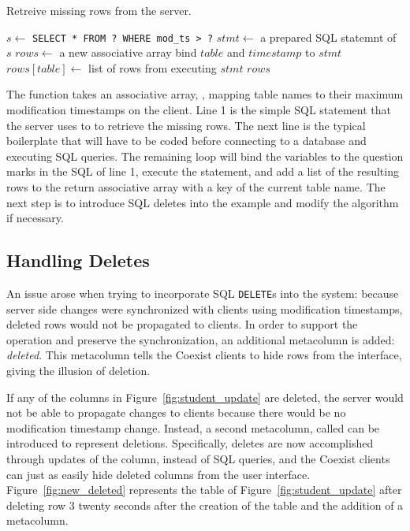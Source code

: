 \begin{algorithm}[h]
\caption{Retreive missing rows from the server.}
\label{alg:sync}
\begin{algorithmic}[1]


  \STATE $s \gets $ \texttt{\sq SELECT * FROM ? WHERE mod\_ts > ?\sq}
  \STATE $stmt \gets $ a prepared SQL statemnt of $s$
  \STATE $rows \gets$ a new associative array
    \STATE bind $table$ and $timestamp$ to $stmt$
    \STATE $rows[table] \gets$ list of rows from executing $stmt$
  \ENDFOR
  \RETURN $rows$
  
\end{algorithmic}
\end{algorithm}

The  function takes an associative array, , mapping table
names to their maximum modification timestamps on the client. Line 1 is the
simple SQL statement that the server uses to to retrieve the missing rows.
The next line is the typical boilerplate that will have to be coded before
connecting to a database and executing SQL queries. The remaining loop will bind
the variables to the question marks in the SQL of line 1, execute the statement,
and add a list of the resulting rows to the return associative array with a key
of the current table name.  The next step is to introduce SQL deletes into the
example and modify the algorithm if necessary.

\subsection{Handling Deletes}  \label{sec:}


An issue arose when trying to incorporate SQL \texttt{DELETE}s into the
system: because server side changes were synchronized with clients using
\mbox{modification} timestamps, deleted rows would not be propagated to clients. In
order to support the  operation and preserve the synchronization, an
additional metacolumn is added: \textit{deleted}.  This metacolumn tells the
Coexist clients to hide rows from the interface, giving the illusion of
deletion. 

If any of the columns in Figure~\ref{fig:student_update} are deleted, the server
would not be able to propagate changes to clients because there would be no
modification timestamp change. Instead, a second metacolumn, called
 can be introduced to represent deletions. Specifically, deletes
are now accomplished through updates of the  column, instead of
SQL  queries, and the Coexist clients can just as easily hide deleted
columns from the user interface. Figure~\ref{fig:new_deleted} represents the
 table of Figure~\ref{fig:student_update} after deleting row 3
twenty seconds after the creation of the table and the addition of
a  metacolumn.


